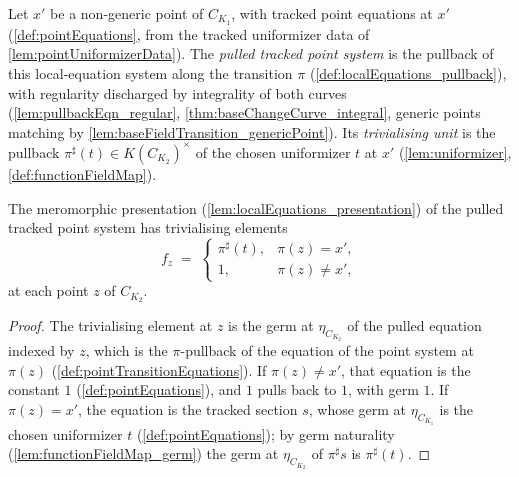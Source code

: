 \begin{definition}
  \label{def:pointTransitionEquations}
  \leanok
  Let \(x'\) be a non-generic point of \(C_{K_1}\), with tracked point equations at
  \(x'\) (\ref{def:pointEquations}, from the tracked uniformizer data of
  \ref{lem:pointUniformizerData}). The \emph{pulled tracked point system} is the
  pullback of this local-equation system along the transition \(\pi\)
  (\ref{def:localEquations_pullback}), with regularity discharged by integrality of
  both curves (\ref{lem:pullbackEqn_regular}, \ref{thm:baseChangeCurve_integral},
  generic points matching by \ref{lem:baseFieldTransition_genericPoint}). Its
  \emph{trivialising unit} is the pullback
  \(\pi^{\sharp}(t) \in K(C_{K_2})^{\times}\) of the chosen uniformizer \(t\) at
  \(x'\) (\ref{lem:uniformizer}, \ref{def:functionFieldMap}).
\end{definition}

\begin{lemma}
  \label{lem:pointTransitionEquations_elem}
  \leanok
  The meromorphic presentation (\ref{lem:localEquations_presentation}) of the pulled
  tracked point system has trivialising elements
  \[
    f_z \;=\;
    \begin{cases}
      \pi^{\sharp}(t), & \pi(z) = x', \\
      1, & \pi(z) \neq x',
    \end{cases}
  \]
  at each point \(z\) of \(C_{K_2}\).
\end{lemma}
\begin{proof}
  \leanok
  The trivialising element at \(z\) is the germ at \(\eta_{C_{K_2}}\) of the pulled
  equation indexed by \(z\), which is the \(\pi\)-pullback of the equation of the
  point system at \(\pi(z)\) (\ref{def:pointTransitionEquations}). If
  \(\pi(z) \neq x'\), that equation is the constant \(1\)
  (\ref{def:pointEquations}), and \(1\) pulls back to \(1\), with germ \(1\). If
  \(\pi(z) = x'\), the equation is the tracked section \(s\), whose germ at
  \(\eta_{C_{K_1}}\) is the chosen uniformizer \(t\) (\ref{def:pointEquations});
  by germ naturality (\ref{lem:functionFieldMap_germ}) the germ at
  \(\eta_{C_{K_2}}\) of \(\pi^{\sharp}s\) is \(\pi^{\sharp}(t)\).
\end{proof}

